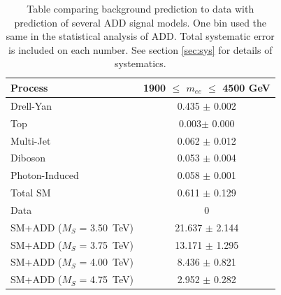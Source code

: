 	\begin {table}[h]
		\begin{center}
		\begin{tabular}{  l | c } 
			\hline
			\hline
			Process & 1900 $\le$ $m_{ee}$ $\le$ 4500 GeV \\
			\hline
			Drell-Yan & 0.435 $\pm$ 0.002 \\
			Top & 0.003$\pm$ 0.000 \\
			Multi-Jet & 0.062 $\pm$ 0.012 \\
			Diboson & 0.053 $\pm$ 0.004 \\
			Photon-Induced & 0.058 $\pm$ 0.001 \\
			\hline
			Total SM & 0.611 $\pm$ 0.129 \\
			\hline
			Data & 0 \\ 
			\hline
			SM+ADD ($M_{S}$ = 3.50~TeV)& 21.637 $\pm$  2.144 \\
			SM+ADD ($M_{S}$ = 3.75~TeV)& 13.171 $\pm$  1.295 \\
			SM+ADD ($M_{S}$ = 4.00~TeV)& 8.436 $\pm$  0.821 \\
			SM+ADD ($M_{S}$ = 4.75~TeV)& 2.952 $\pm$  0.282 \\
	    	\hline
	    	\hline
	  	\end{tabular}
	  	\caption{Table comparing background prediction to data with prediction of several ADD signal models. One bin used the same in the statistical analysis of ADD. Total systematic error is included on each number. See section \ref{sec:sys} for details of systematics.}
	  	\label{tab:ADD_results}
	  	\end{center}
	\end {table}









